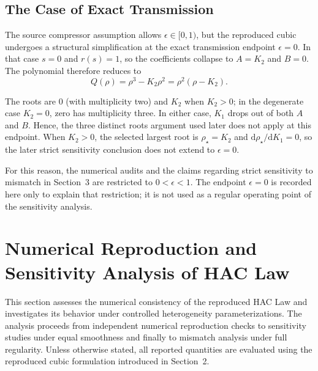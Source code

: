 \documentclass[mathematics,article,submit,moreauthors]{Definitions/mdpi}
\begin{document}
\subsection{The Case of Exact Transmission}\label{sec:root-audit}
The source compressor assumption allows \(\epsilon\in[0,1)\), but the reproduced cubic undergoes a structural simplification at the exact transmission endpoint \(\epsilon=0\). In that case $s=0$ and $r(s)=1$, so the coefficients collapse to $A=K_2$ and $B=0$. The polynomial therefore reduces to
\[
Q(\rho)=\rho^3-K_2\rho^2=\rho^2(\rho-K_2).
\]

The roots are \(0\) (with multiplicity two) and \(K_2\) when \(K_2>0\); in the degenerate case \(K_2=0\), zero has multiplicity three. In either case, \(K_1\) drops out of both \(A\) and \(B\). Hence, the three distinct roots argument used later does not apply at this endpoint. When \(K_2>0\), the selected largest root is \(\rho_\star=K_2\) and \(\mathrm{d}\rho_\star/\mathrm{d}K_1=0\), so the later strict sensitivity conclusion does not extend to \(\epsilon=0\).

For this reason, the numerical audits and the claims regarding strict sensitivity to mismatch in Section~3 are restricted to $0<\epsilon<1$. The endpoint $\epsilon=0$ is recorded here only to explain that restriction; it is not used as a regular operating point of the sensitivity analysis. 

\section{Numerical Reproduction and Sensitivity Analysis of HAC Law}
This section assesses the numerical consistency of the reproduced HAC Law and investigates its behavior under controlled heterogeneity parameterizations. The analysis proceeds from independent numerical reproduction checks to sensitivity studies under equal smoothness and finally to mismatch analysis under full regularity. Unless otherwise stated, all reported quantities are evaluated using the reproduced cubic formulation introduced in Section~2.
\end{document}
